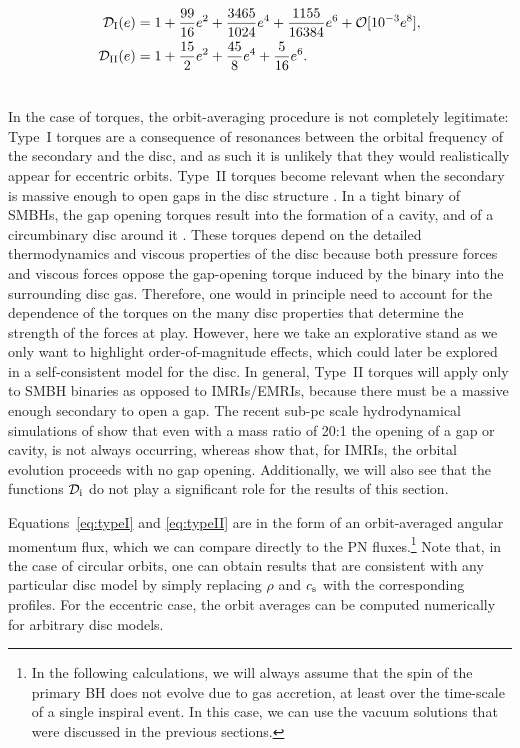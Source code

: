 \documentclass[usenatbib]{mnras}
\begin{document}
\begin{align}
    \mathcal{D}_{\rm I}(e) &=1 + \frac{99 }{16}e^2 + \frac{3465 }{1024}e^4 + \frac{1155}{16384}e^6+ \mathcal{O}[10^{-3}  e^8], \\
    \mathcal{D}_{\rm II}(e) &=1+\frac{15}{2} e^2+\frac{45 }{8}e^4+\frac{5}{16}e^6.\\ \nonumber
\end{align}

In the case of torques, the orbit-averaging procedure is not completely legitimate: Type~I torques are a consequence of resonances between the orbital frequency of the secondary and the disc, and as such it is unlikely that they would realistically appear for eccentric orbits. Type~II torques become relevant when the secondary is massive enough to open gaps in the disc structure \citep[see, e.g.][]{1980ApJ...241..425G,1997Icar..126..261W}. In a tight binary of SMBHs, the gap opening torques result into the formation of a cavity, and of a circumbinary disc around it \citep[e.g.][]{cuadra,2012A&A...545A.127R,2017MNRAS.469.4258T}. These torques depend on the detailed thermodynamics and viscous properties of the disc because both pressure forces and viscous forces oppose the gap-opening torque induced by the binary into the surrounding disc gas. Therefore, one would in principle need to account for the dependence of the torques on the many disc properties that determine the strength of the forces at play. However, here we take an explorative stand as we only want to highlight order-of-magnitude effects, which could later be explored in a self-consistent model for the disc. In general, Type~II torques will apply only to SMBH binaries as opposed to IMRIs/EMRIs, because there must be a massive enough secondary to open a gap. The recent sub-pc scale hydrodynamical simulations of \citet{2020ApJ...899..126S} show that even with a mass ratio of 20:1 the opening of a gap or cavity, is not always occurring, whereas \citet{2020arXiv200511333D} show that, for IMRIs, the orbital evolution proceeds with no gap opening. Additionally, we will also see that the functions $\mathcal{D}_{\rm i}$ do not play a significant role for the results of this section.

Equations~\eqref{eq:typeI} and \eqref{eq:typeII} are in the form of an orbit-averaged angular momentum flux, which we can compare directly to the PN fluxes.\footnote{In the following calculations, we will always assume that the spin of the primary BH does not evolve due to gas accretion, at least over the time-scale of a single inspiral event. In this case, we can use the vacuum solutions that were discussed in the previous sections.} Note that, in the case of circular orbits, one can obtain results that are consistent with any particular disc model by simply replacing $\rho$ and $c_{\rm s}$ with the corresponding profiles. For the eccentric case, the orbit averages can be computed numerically for arbitrary disc models.
\end{document}
